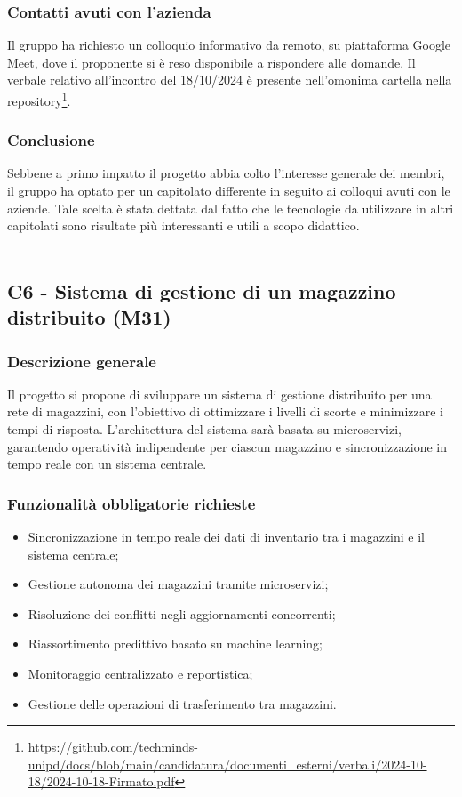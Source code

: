 \documentclass[10pt]{article}
\begin{document}
\subsubsection{Contatti avuti con l'azienda}
Il gruppo ha richiesto un colloquio informativo da remoto, su piattaforma Google Meet, dove il proponente si è reso disponibile a rispondere alle domande. Il verbale relativo all'incontro del 18/10/2024 è presente nell'omonima cartella nella repository\footnote{\url{https://github.com/techminds-unipd/docs/blob/main/candidatura/documenti_esterni/verbali/2024-10-18/2024-10-18-Firmato.pdf}}.
\subsubsection{Conclusione}
Sebbene a primo impatto il progetto abbia colto l'interesse generale dei membri, il gruppo ha optato per un capitolato differente in seguito ai colloqui avuti con le aziende. Tale scelta è stata dettata dal fatto che le tecnologie da utilizzare in altri capitolati sono risultate più interessanti e utili a scopo didattico.
\\\\
\subsection{C6 - Sistema di gestione di un magazzino distribuito (M31)}
\subsubsection{Descrizione generale}
Il progetto si propone di sviluppare un sistema di gestione distribuito per una rete di magazzini, con l'obiettivo di ottimizzare i livelli di scorte e minimizzare i tempi di risposta. L'architettura del sistema sarà basata su microservizi, garantendo operatività indipendente per ciascun magazzino e sincronizzazione in tempo reale con un sistema centrale.
\subsubsection{Funzionalità obbligatorie richieste}
\begin{itemize}
    \item Sincronizzazione in tempo reale dei dati di inventario tra i magazzini e il sistema centrale;
    \item Gestione autonoma dei magazzini tramite microservizi;
    \item Risoluzione dei conflitti negli aggiornamenti concorrenti;
    \item Riassortimento predittivo basato su machine learning;
    \item Monitoraggio centralizzato e reportistica;
    \item Gestione delle operazioni di trasferimento tra magazzini.
\end{itemize}
\end{document}

